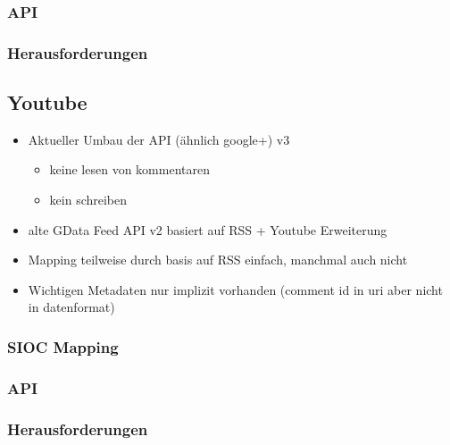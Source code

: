 \subsubsection{API} %
\label{ssub:google_plus_api}

\subsubsection{Herausforderungen} %
\label{ssub:google_plus_herausforderungen}





\subsection{Youtube } %
\label{sub:youtube_connector}

\begin{itemize}
    \item Aktueller Umbau der API (ähnlich google+) v3
    \begin{itemize}
        \item keine lesen von kommentaren
        \item kein schreiben
    \end{itemize}
    \item alte GData Feed API v2 basiert auf RSS + Youtube Erweiterung
    \item Mapping teilweise durch basis auf RSS einfach, manchmal auch nicht
    \item Wichtigen Metadaten nur implizit vorhanden (comment id in uri aber nicht in datenformat)
\end{itemize}

\subsubsection{SIOC Mapping} %
\label{ssub:youtube_sioc_mapping}

\subsubsection{API} %
\label{ssub:youtube_api}

\subsubsection{Herausforderungen} %
\label{ssub:youtube_herausforderungen}

